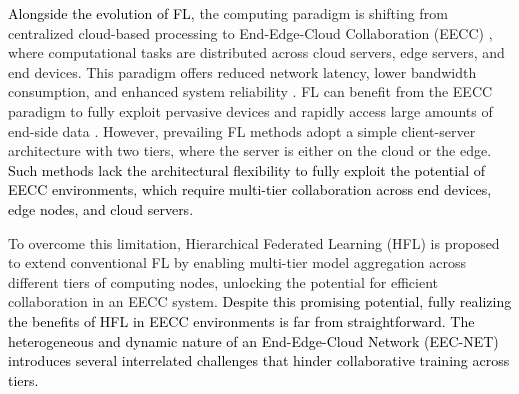 \documentclass[10pt,journal]{IEEEtran}
\begin{document}
\textcolor{black}{Alongside the evolution of FL,} the computing paradigm is shifting from centralized cloud-based processing to End-Edge-Cloud Collaboration (EECC) \cite{duan2022distributed}, where computational tasks are distributed across cloud servers, edge servers, and end devices.
This paradigm offers reduced network latency, lower bandwidth consumption, and enhanced system reliability \cite{wang2024end}. FL can benefit from the EECC paradigm to fully exploit pervasive devices and rapidly access large amounts of end-side data \cite{bao2022federated}. 
However, prevailing FL methods \cite{mcmahan2017communication,li2020federated,karimireddy2020scaffold} adopt a simple client-server architecture with two tiers, where the server is either on the cloud or the edge. \textcolor{black}{Such methods lack the architectural flexibility to fully exploit the potential of EECC environments, which require multi-tier collaboration across end devices, edge nodes, and cloud servers.}


To overcome this limitation, Hierarchical Federated Learning (HFL) \cite{liu2020client} is proposed to extend conventional FL by enabling multi-tier model aggregation across different tiers of computing nodes, unlocking the potential for efficient collaboration in an EECC system. 
\textcolor{black}{Despite this promising potential, fully realizing the benefits of HFL in EECC environments is far from straightforward. The heterogeneous and dynamic nature of an End-Edge-Cloud Network (EEC-NET) introduces several interrelated challenges that hinder collaborative training across tiers.}
\end{document}
